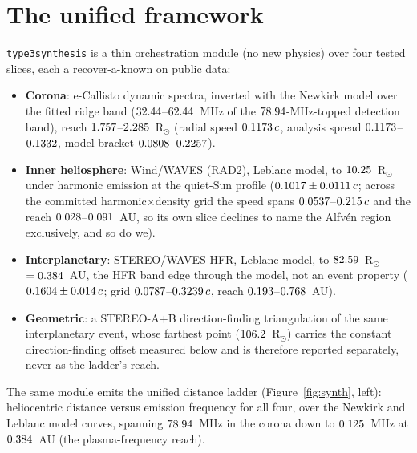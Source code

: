 \documentclass[twocolumn]{aastex631}
\newcommand{\code}[1]{\texttt{#1}}
\begin{document}
\section{The unified framework}
\code{type3synthesis} is a thin orchestration module (no new physics) over four tested slices, each a
recover-a-known on public data:
\begin{itemize}
\item \textbf{Corona}: e-Callisto dynamic spectra, inverted with the Newkirk model over the
fitted ridge band ($32.44$--$62.44$~MHz of the
$78.94$-MHz-topped detection band), reach
$1.757$--$2.285$~R$_\odot$ (radial speed $0.1173\,c$,
analysis spread $0.1173$--$0.1332$, model bracket
$0.0808$--$0.2257$).
\item \textbf{Inner heliosphere}: Wind/WAVES (RAD2), Leblanc model, to $10.25$~R$_\odot$
under harmonic emission at the quiet-Sun profile ($0.1017\pm0.0111\,c$;
across the committed harmonic$\times$density grid the speed spans
$0.0537$--$0.215\,c$ and the reach
$0.028$--$0.091$~AU, so its own slice declines to name the
Alfv\'en region exclusively, and so do we).
\item \textbf{Interplanetary}: STEREO/WAVES HFR, Leblanc model, to $82.59$~R$_\odot$
$=0.384$~AU, the HFR band edge through the model, not an event property
($0.1604\pm0.014\,c$; grid
$0.0787$--$0.3239\,c$, reach
$0.193$--$0.768$~AU).
\item \textbf{Geometric}: a STEREO-A$+$B direction-finding triangulation of the same
interplanetary event, whose farthest point ($106.2$~R$_\odot$) carries the constant
direction-finding offset measured below and is therefore reported separately, never as the
ladder's reach.
\end{itemize}
The same module emits the unified distance ladder (Figure~\ref{fig:synth}, left): heliocentric distance
versus emission frequency for all four, over the Newkirk and Leblanc model curves, spanning
$78.94$~MHz in the corona down to $0.125$~MHz at $0.384$~AU (the
plasma-frequency reach).
\end{document}
